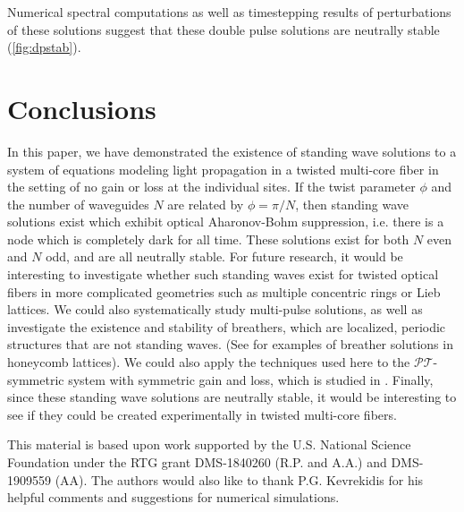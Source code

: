 \documentclass[reprint, amsmath,amssymb,aps,pra]{revtex4-2}
\begin{document}
Numerical spectral computations as well as timestepping results of perturbations of these solutions suggest that these double pulse solutions are neutrally stable (\cref{fig:dpstab}).

\section{Conclusions}

In this paper, we have demonstrated the existence of standing wave solutions to a system of equations modeling light propagation in a twisted multi-core fiber in the setting of no gain or loss at the individual sites. If the twist parameter $\phi$ and the number of waveguides $N$ are related by $\phi = \pi/N$, then standing wave solutions exist which exhibit optical Aharonov-Bohm suppression, i.e. there is a node which is completely dark for all time. These solutions exist for both $N$ even and $N$ odd, and are all neutrally stable. For future research, it would be interesting to investigate whether such standing waves exist for twisted optical fibers in more complicated geometries such as multiple concentric rings or Lieb lattices. We could also systematically study multi-pulse solutions, as well as investigate the existence and stability of breathers, which are localized, periodic structures that are not standing waves. (See \cite{Lumer2013} for examples of breather solutions in honeycomb lattices). We could also apply the techniques used here to the $\mathcal{PT}$-symmetric system with symmetric gain and loss, which is studied in \cite{castro2016}. Finally, since these standing wave solutions are neutrally stable, it would be interesting to see if they could be created experimentally in twisted multi-core fibers.

\begin{acknowledgments}
This material is based upon work supported by the U.S. National Science Foundation under the RTG grant DMS-1840260 (R.P. and A.A.) and DMS-1909559 (AA). The authors would also like to thank P.G. Kevrekidis for his helpful comments and suggestions for numerical simulations.
\end{acknowledgments}



\end{document}
